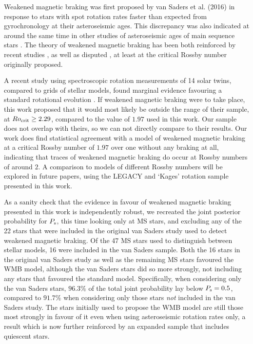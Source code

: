 \documentclass[12pt]{article}
\begin{document}
Weakened magnetic braking was first proposed by van Saders et al. (2016) \cite[hereafter the `van Saders' study]{vansaders+2016} in response to stars with spot rotation rates faster than expected from gyrochronology at their asteroseismic ages. This discrepancy was also indicated at around the same time in other studies of asteroseismic ages of main sequence stars \cite{angus+2015, nielsen+2015,  davies+2015}. The theory of weakened magnetic braking has been both reinforced by recent studies \cite{metcalfe+egeland2019}, as well as disputed \cite{lorenzo-oliveira+2019}, at least at the critical Rossby number originally proposed.

A recent study using spectroscopic rotation measurements of 14 solar twins, compared to grids of stellar models, found marginal evidence favouring a standard rotational evolution \cite{lorenzo-oliveira+2019}. If weakened magnetic braking were to take place, this work proposed that it would most likely be outside the range of their sample, at $Ro_{\rm {crit}} \geq 2.29$, compared to the value of $1.97$ used in this work. Our sample does not overlap with theirs, so we can not directly compare to their results. Our work does find statistical agreement with a model of weakened magnetic braking at a critical Rossby number of $1.97$ over one without any braking at all, indicating that traces of weakened magnetic braking do occur at Rossby numbers of around $2$. A comparison to models of different Rossby numbers will be explored in future papers, using the LEGACY and `Kages' rotation sample presented in this work.

As a sanity check that the evidence in favour of weakened magnetic braking presented in this work is independently robust, we recreated the joint posterior probability for $P_{\rm s}$, this time looking only at MS stars, and excluding any of the 22 stars that were included in the original van Saders study used to detect weakened magnetic braking. Of the 47 MS stars used to distinguish between stellar models, 16 were included in the van Saders sample. Both the 16 stars in the original van Saders study as well as the remaining MS stars favoured the WMB model, although the van Saders stars did so more strongly, not including any stars that favoured the standard model. Specifically, when considering only the van Saders stars, $96.3\%$ of the total joint probability lay below $P_{\rm s} = 0.5$, compared to $91.7\%$ when considering only those stars \emph{not} included in the van Saders study. The stars initially used to propose the WMB model are still those most strongly in favour of it even when using asteroseismic rotation rates only, a result which is now further reinforced by an expanded sample that includes quiescent stars.\\
\end{document}
